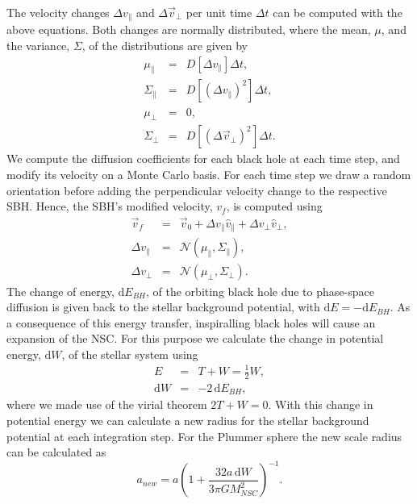 \documentclass[english, apj]{emulateapj}
\begin{document}
The velocity changes $\Delta v_\parallel$ and $\Delta\vec{v}_\bot$ per unit time $\Delta t$ can be computed with the above equations. Both changes are normally distributed, where the mean, $\mu$, and the variance, $\Sigma$, of the distributions are given by
\begin{eqnarray}
\mu_\parallel &=& D[\Delta v_\parallel]\Delta t,\\
\Sigma_\parallel &=& D[(\Delta v_\parallel)^2]\Delta t,\\
\mu_\bot &=& 0,\\
\Sigma_\bot &=& D[(\Delta \vec{v}_\bot)^2]\Delta t.
\end{eqnarray}
We compute the diffusion coefficients for each black hole at each time step, and modify its velocity on a Monte Carlo basis. For each time step we draw a random orientation before adding the perpendicular velocity change to the respective SBH. Hence, the SBH's modified velocity, $v_f$, is computed using
\begin{eqnarray}
\vec{v}_f &=& \vec{v}_0 + \Delta v_\parallel \hat{v}_\parallel + \Delta v_\bot \hat{v}_\bot,\\
\Delta v_\parallel &=& \mathcal{N}(\mu_\parallel, \Sigma_\parallel),\\
\Delta v_\bot &=& \mathcal{N}(\mu_\bot, \Sigma_\bot).
\end{eqnarray}
The change of energy, $\mbox{d}E_{BH}$, of the orbiting black hole due to phase-space diffusion is given back to the stellar background potential, with $\mbox{d}E = -\mbox{d}E_{BH}$. As a consequence of this energy transfer, inspiralling black holes will cause an expansion of the NSC. For this purpose we calculate the change in potential energy, $\mbox{d}W$, of the stellar system using
\begin{eqnarray}
E &=& T + W = \frac{1}{2}W,\\
\mbox{d}W &=& -2\,\mbox{d}E_{BH},
\end{eqnarray}
where we made use of the virial theorem $2T+W =0$. With this change in potential energy we can calculate a new radius for the stellar background potential at each integration step. For the Plummer sphere the new scale radius can be calculated as
\begin{equation}
a_{new} = a\left(1+\frac{32a\,\mbox{d}W}{3\pi GM_{NSC}^2}\right)^{-1}.
\end{equation}
\end{document}
